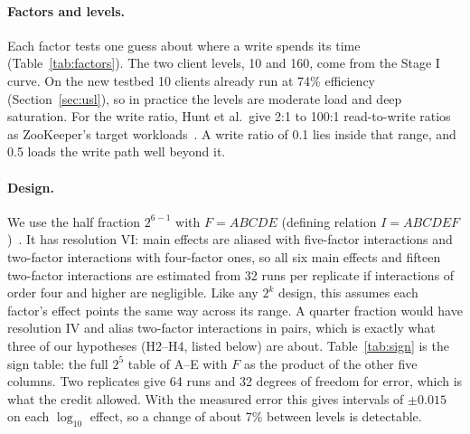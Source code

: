 \documentclass{llncs}
\begin{document}
\paragraph{Factors and levels.} Each factor tests one guess about where a write spends its time (Table~\ref{tab:factors}). The two client levels, 10 and 160, come from the Stage I curve. On the new testbed 10 clients already run at 74\% efficiency (Section~\ref{sec:usl}), so in practice the levels are moderate load and deep saturation. For the write ratio, Hunt et al.\ give 2:1 to 100:1 read-to-write ratios as ZooKeeper's target workloads~\cite{hunt_zookeeper}. A write ratio of 0.1 lies inside that range, and 0.5 loads the write path well beyond it.

\begin{table}[t]
  \centering
  \caption{Factors and levels. ``Hard'': changing it needs a rebuild of the servers.}
  \label{tab:factors}
  \scriptsize
  
\end{table}

\paragraph{Design.} We use the half fraction $2^{6-1}$ with $F=ABCDE$ (defining relation $I=ABCDEF$)~\cite{jain_book}. It has resolution VI: main effects are aliased with five-factor interactions and two-factor interactions with four-factor ones, so all six main effects and fifteen two-factor interactions are estimated from 32 runs per replicate if interactions of order four and higher are negligible. Like any $2^k$ design, this assumes each factor's effect points the same way across its range. A quarter fraction would have resolution IV and alias two-factor interactions in pairs, which is exactly what three of our hypotheses (H2--H4, listed below) are about. Table~\ref{tab:sign} is the sign table: the full $2^5$ table of A--E with $F$ as the product of the other five columns. Two replicates give 64 runs and 32 degrees of freedom for error, which is what the credit allowed. With the measured error this gives intervals of $\pm0.015$ on each $\log_{10}$ effect, so a change of about 7\% between levels is detectable.

\begin{table}[t]
  \centering
  \caption{Sign table of the $2^{6-1}$ design with the mean of $\log_{10}$ throughput over the two replicates; the last
    row is the effect $q_j$ of each factor and the grand mean $q_0$.}
  \label{tab:sign}
  \scriptsize
  \setlength{\tabcolsep}{2.4pt}
  
\end{table}
\end{document}
